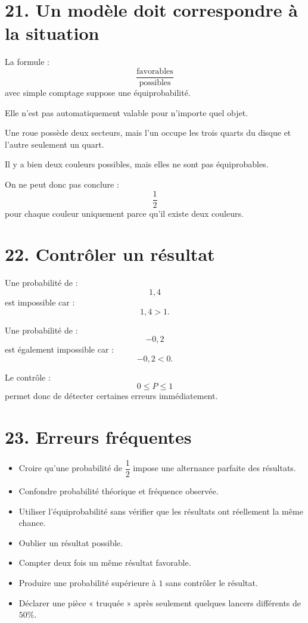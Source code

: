 \section{21. Un modèle doit correspondre à la situation}

La formule :
\[
\dfrac{\text{favorables}}{\text{possibles}}
\]
avec simple comptage suppose une équiprobabilité.

Elle n'est pas automatiquement valable pour n'importe quel objet.

\begin{exemple}
Une roue possède deux secteurs, mais l'un occupe les trois quarts du disque et l'autre seulement un quart.

Il y a bien deux couleurs possibles, mais elles ne sont pas équiprobables.

On ne peut donc pas conclure :
\[
\dfrac12
\]
pour chaque couleur uniquement parce qu'il existe deux couleurs.
\end{exemple}

\section{22. Contrôler un résultat}

Une probabilité de :
\[
1{,}4
\]
est impossible car :
\[
1{,}4>1.
\]

Une probabilité de :
\[
-0{,}2
\]
est également impossible car :
\[
-0{,}2<0.
\]

Le contrôle :
\[
0\le P\le1
\]
permet donc de détecter certaines erreurs immédiatement.

\section{23. Erreurs fréquentes}

\begin{itemize}
\item Croire qu'une probabilité de $\dfrac12$ impose une alternance parfaite des résultats.
\item Confondre probabilité théorique et fréquence observée.
\item Utiliser l'équiprobabilité sans vérifier que les résultats ont réellement la même chance.
\item Oublier un résultat possible.
\item Compter deux fois un même résultat favorable.
\item Produire une probabilité supérieure à $1$ sans contrôler le résultat.
\item Déclarer une pièce « truquée » après seulement quelques lancers différents de $50\%$.
\end{itemize}

